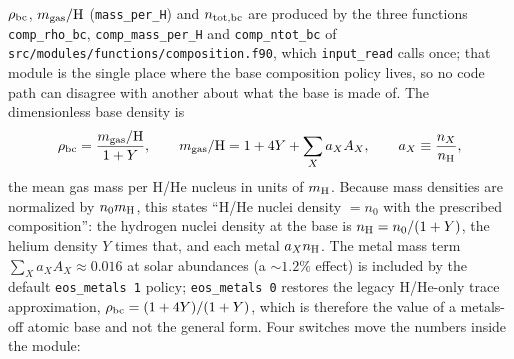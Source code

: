 \documentclass[english,a4paper]{my_memo}
\begin{document}
$\rho_{\rm bc}$, $m_{\rm gas}/{\rm H}$ (\texttt{mass\_per\_H}) and
$n_{\rm tot,bc}$ are produced by the three functions
\texttt{comp\_rho\_bc}, \texttt{comp\_mass\_per\_H} and
\texttt{comp\_ntot\_bc} of
\texttt{src/modules/functions/composition.f90}, which \texttt{input\_read}
calls once; that module is the single place where the base composition
policy lives, so no code path can disagree with another about what the base
is made of. The dimensionless base density is
\begin{equation}
\rho_{\rm bc} = \frac{m_{\rm gas}/{\rm H}}{1 + Y},
\qquad
m_{\rm gas}/{\rm H} = 1 + 4Y + \sum_X a_X A_X,
\qquad a_X \equiv \frac{n_X}{n_{\rm H}},
\label{eq:rhobc}
\end{equation}
the mean gas mass per H/He nucleus in units of $m_{\rm H}$. Because mass
densities are normalized by $n_0 m_{\rm H}$, this states ``H/He nuclei
density $=n_0$ with the prescribed composition'': the hydrogen nuclei
density at the base is $n_{\rm H} = n_0/(1+Y)$, the helium density $Y$ times
that, and each metal $a_X n_{\rm H}$. The metal mass term
$\sum_X a_X A_X \approx 0.016$ at solar abundances (a ${\sim}1.2\%$ effect)
is included by the default \texttt{eos\_metals 1} policy;
\texttt{eos\_metals 0} restores the legacy H/He-only trace approximation,
$\rho_{\rm bc} = (1+4Y)/(1+Y)$, which is therefore the value of a metals-off
atomic base and not the general form. Four switches move the numbers inside
the module:
\end{document}
